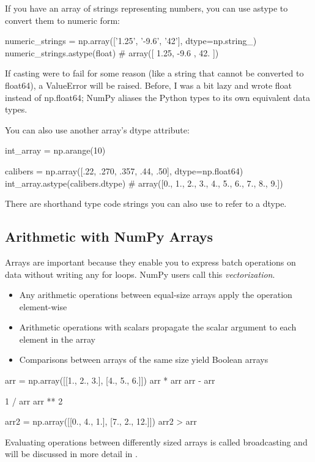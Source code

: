 If you have an array of strings representing numbers, you can use astype to convert them to numeric form:
\begin{pyc}
numeric_strings = np.array(['1.25', '-9.6', '42'], dtype=np.string_)
numeric_strings.astype(float)
# array([ 1.25, -9.6 , 42.  ])
\end{pyc}


If casting were to fail for some reason (like a string that cannot be converted to float64), a ValueError will be raised. Before, I was a bit lazy and wrote float instead of np.float64; NumPy aliases the Python types to its own equivalent data types.

You can also use another array’s dtype attribute:
\begin{pyc}
int_array = np.arange(10)

calibers = np.array([.22, .270, .357, .44, .50], dtype=np.float64)
int_array.astype(calibers.dtype)
# array([0., 1., 2., 3., 4., 5., 6., 7., 8., 9.])
\end{pyc}

There are shorthand type code strings you can also use to refer to a dtype.


\subsection{Arithmetic with NumPy Arrays}
Arrays are important because they enable you to express batch operations on data  without writing any for loops. NumPy users call this \emph{vectorization}.
\begin{itemize}
    \item Any arithmetic operations between equal-size arrays apply the operation element-wise
    \item Arithmetic operations with scalars propagate the scalar argument to each element in the array
    \item Comparisons between arrays of the same size yield Boolean arrays
\end{itemize}
\begin{pyc}
arr = np.array([[1., 2., 3.], [4., 5., 6.]])
arr * arr
arr - arr

1 / arr
arr ** 2

arr2 = np.array([[0., 4., 1.], [7., 2., 12.]])
arr2 > arr
\end{pyc}
Evaluating operations between differently sized arrays is called broadcasting and will be discussed in more detail in .
